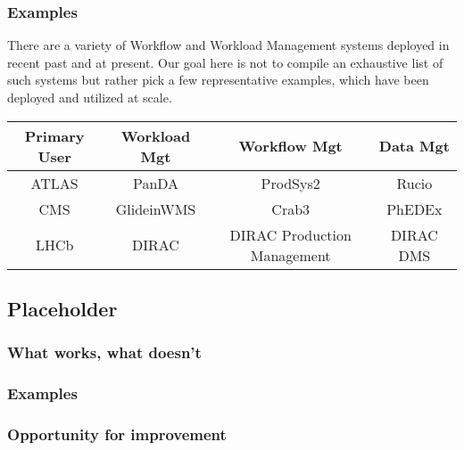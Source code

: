 \subsubsection{Examples}
\label{wms_examples}
There are a variety of Workflow and Workload Management systems deployed in recent past and at present. Our goal here is not to compile an exhaustive list of such systems but rather pick a few representative examples, which have been deployed and utilized at scale.


\begin{center}
  \begin{tabular}{ c | c | c | c }
    \hline
    Primary User & Workload Mgt & Workflow Mgt & Data Mgt\\ \hline
    ATLAS & PanDA & ProdSys2 & Rucio\\ \hline
    CMS  & GlideinWMS & Crab3 & PhEDEx\\ \hline
    LHCb  & DIRAC & DIRAC Production Management & DIRAC DMS\\ \hline
    \hline
  \end{tabular}
\end{center}

\subsection{Placeholder}
\subsubsection{What works, what doesn't}
\subsubsection{Examples}
\subsubsection{Opportunity for improvement}
